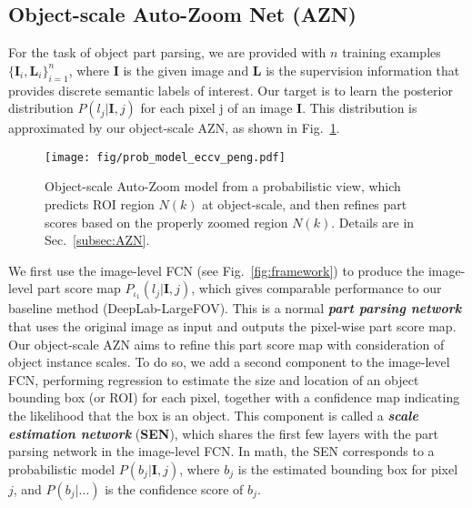 \documentclass[runningheads]{llncs}
\newcommand{\ve}[1]{{\mathbf #1}}
\begin{document}
\vspace{-0.7\baselineskip}
\subsection{Object-scale Auto-Zoom Net (AZN)}
\vspace{-0.4\baselineskip}
\label{subsec:AZN}
For the task of object part parsing, we are provided with $n$ training examples $\{\ve{I}_i, \ve{L}_i\}_{i=1}^{n}$, where $\ve{I}$ is the given image and $\ve{L}$ is the supervision information that provides discrete semantic labels of interest. Our target is to learn the posterior distribution $P(l_j | \ve{I},j)$ for each pixel j of an image $\ve{I}$. This distribution is approximated by our object-scale AZN, as shown in Fig.~\ref{fig:prob_model}.

\begin{figure}[!t]
\begin{center}
\texttt{[image: fig/prob\_model\_eccv\_peng.pdf]}
\end{center}
\vspace{-1\baselineskip}
 \caption{Object-scale Auto-Zoom model from a probabilistic view, which predicts ROI region $N(k)$ at object-scale, and then refines part scores based on the properly zoomed region $N(k)$. Details are in Sec.~\ref{subsec:AZN}.}
\vspace{-1.6\baselineskip}
\label{fig:prob_model}
\end{figure}

We first use the image-level FCN (see Fig.~\ref{fig:framework}) to produce the image-level part score map $P_{\iota_1}(l_j | \ve{I},j)$, which gives comparable performance to our baseline method (DeepLab-LargeFOV). This is a normal \emph{\textbf{part parsing network}} that uses the original image as input and outputs the pixel-wise part score map. Our object-scale AZN aims to refine this part score map with consideration of object instance scales. To do so, we add a second component to the image-level FCN, performing regression to estimate the size and location of an object bounding box (or ROI) for each pixel, together with a confidence map indicating the likelihood that the box is an object. This component is called a \emph{\textbf{scale estimation network}} (\textbf{SEN}), which shares the first few layers with the part parsing network in the image-level FCN. In math, the SEN corresponds to a probabilistic model $P(b_j | \ve{I}, j)$, where $b_j$ is the estimated bounding box for pixel $j$, and $P(b_j|...)$ is the confidence score of $b_j$.
\end{document}
